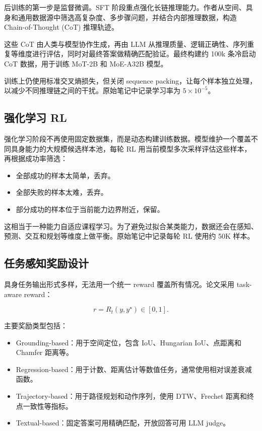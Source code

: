 后训练的第一步是监督微调。SFT 阶段重点强化长链推理能力。作者从空间、具身和通用数据源中筛选高复杂度、多步骤问题，并结合内部推理数据，构造 Chain-of-Thought (CoT) 推理轨迹。

这些 CoT 由人类与模型协作生成，再由 LLM 从推理质量、逻辑正确性、序列重复等维度进行评估，同时对最终答案做精确匹配验证。最终构建约 100k 条冷启动 CoT 数据，用于训练 MoT-2B 和 MoE-A32B 模型。

训练上仍使用标准交叉熵损失，但关闭 sequence packing，让每个样本独立处理，以减少不同推理链之间的干扰。原始笔记中记录学习率为 $5\times10^{-5}$。

\subsection{强化学习 RL}

强化学习阶段不再使用固定数据集，而是动态构建训练数据。模型维护一个覆盖不同具身能力的大规模候选样本池，每轮 RL 用当前模型多次采样评估这些样本，再根据成功率筛选：

\begin{itemize}
    \item 全部成功的样本太简单，丢弃。
    \item 全部失败的样本太难，丢弃。
    \item 部分成功的样本位于当前能力边界附近，保留。
\end{itemize}

这相当于一种能力自适应课程学习。为了避免过拟合某类能力，数据还会在感知、预测、交互和规划等维度上做平衡。原始笔记中记录每轮 RL 使用约 50K 样本。

\subsection{任务感知奖励设计}

具身任务输出形式多样，无法用一个统一 reward 覆盖所有情况。论文采用 task-aware reward：

\begin{equation}
    r = R_t(y, y^\star) \in [0,1].
\end{equation}

主要奖励类型包括：

\begin{itemize}
    \item Grounding-based：用于空间定位，包含 IoU、Hungarian IoU、点距离和 Chamfer 距离等。
    \item Regression-based：用于计数、距离估计等数值任务，通常使用相对误差衰减函数。
    \item Trajectory-based：用于路径规划和动作序列，使用 DTW、Frechet 距离和终点一致性等指标。
    \item Textual-based：固定答案可用精确匹配，开放回答可用 LLM judge。
\end{itemize}

